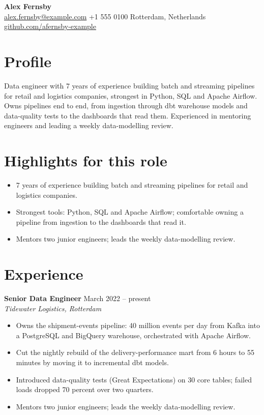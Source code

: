 \documentclass[10pt,a4paper]{article}
\newcommand{\entry}[3]{\textbf{#1} \hfill #3\\ \emph{#2}\vspace{-2pt}}
\begin{document}
{\LARGE\textbf{Alex Fernsby}}\\
\href{mailto:alex.fernsby@example.com}{alex.fernsby@example.com} \quad +1 555 0100 \quad
Rotterdam, Netherlands \quad \href{https://github.com/afernsby-example}{github.com/afernsby-example}

\section*{Profile}
Data engineer with 7 years of experience building batch and streaming pipelines for retail and
logistics companies, strongest in Python, SQL and Apache Airflow. Owns pipelines end to end, from
ingestion through dbt warehouse models and data-quality tests to the dashboards that read them.
Experienced in mentoring engineers and leading a weekly data-modelling review.

\section*{Highlights for this role}
\begin{itemize}\setlength\itemsep{2pt}
  \item 7 years of experience building batch and streaming pipelines for retail and logistics companies.
  \item Strongest tools: Python, SQL and Apache Airflow; comfortable owning a pipeline from ingestion to the
        dashboards that read it.
  \item Mentors two junior engineers; leads the weekly data-modelling review.
\end{itemize}

\section*{Experience}
\entry{Senior Data Engineer}{Tidewater Logistics, Rotterdam}{March 2022 -- present}
\begin{itemize}\setlength\itemsep{2pt}
  \item Owns the shipment-events pipeline: 40 million events per day from Kafka into a PostgreSQL and
        BigQuery warehouse, orchestrated with Apache Airflow.
  \item Cut the nightly rebuild of the delivery-performance mart from 6 hours to 55 minutes by moving it to
        incremental dbt models.
  \item Introduced data-quality tests (Great Expectations) on 30 core tables; failed loads dropped 70 percent
        over two quarters.
  \item Mentors two junior engineers; leads the weekly data-modelling review.
\end{itemize}
\end{document}
